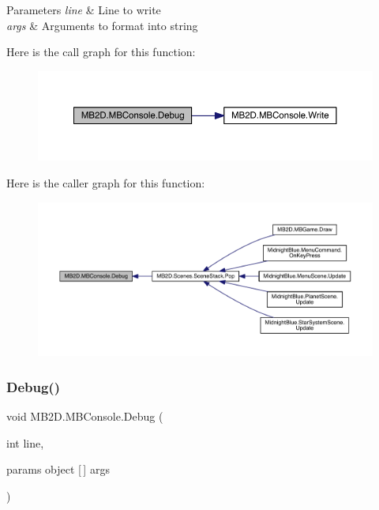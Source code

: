 \begin{DoxyParams}{Parameters}
{\em line} & Line to write\\
\hline
{\em args} & Arguments to format into string\\
\hline
\end{DoxyParams}
Here is the call graph for this function\+:\nopagebreak
\begin{figure}[H]
\begin{center}
\leavevmode
\includegraphics[width=350pt]{class_m_b2_d_1_1_m_b_console_a6f0c0f179b2fef32a130a5e1d4957a70_cgraph}
\end{center}
\end{figure}
Here is the caller graph for this function\+:\nopagebreak
\begin{figure}[H]
\begin{center}
\leavevmode
\includegraphics[width=350pt]{class_m_b2_d_1_1_m_b_console_a6f0c0f179b2fef32a130a5e1d4957a70_icgraph}
\end{center}
\end{figure}
\hypertarget{class_m_b2_d_1_1_m_b_console_a1235820bedb1bc0598c863a0d7033329}{}\label{class_m_b2_d_1_1_m_b_console_a1235820bedb1bc0598c863a0d7033329} 
\subsubsection{\texorpdfstring{Debug()}{Debug()}\hspace{0.1cm}{\footnotesize\ttfamily [2/4]}}
{\footnotesize\ttfamily void M\+B2\+D.\+M\+B\+Console.\+Debug (\begin{DoxyParamCaption}\item[{int}]{line,  }\item[{params object \mbox{[}$\,$\mbox{]}}]{args }\end{DoxyParamCaption})\hspace{0.3cm}{\ttfamily [inline]}}



